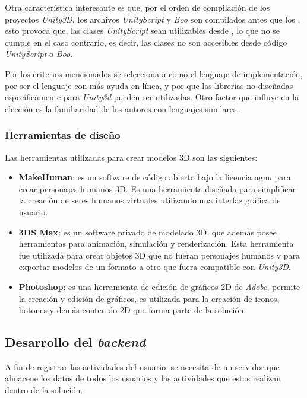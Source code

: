 Otra característica interesante es que, por el orden de compilación de los
proyectos \textit{Unity3D}, los archivos \textit{UnityScript} y \textit{Boo} son
compilados antes que los \cs{}, esto provoca que, las clases
\textit{UnityScript} sean utilizables desde \cs{}, lo que no se cumple en el
caso contrario, es decir, las clases \cs{} no son accesibles desde código
\textit{UnityScript} o \textit{Boo}.

Por los criterios mencionados se selecciona a \cs{} como el lenguaje de
implementación, por ser el lenguaje con más ayuda en línea, y por que las
librerías no diseñadas específicamente para \textit{Unity3d} pueden ser
utilizadas. Otro factor que influye en la elección es la familiaridad de los
autores con lenguajes similares. 

\subsubsection{Herramientas de diseño}

Las herramientas utilizadas para crear modelos 3D son las siguientes:

\begin{itemize}
\item \textbf{MakeHuman}: es un software de código abierto bajo la licencia
    \Gls{agnu} para crear personajes humanos 3D. Es una herramienta diseñada
    para simplificar la creación de seres humanos virtuales utilizando una
    interfaz gráfica de usuario\cite{makehuman}. 
\item \textbf{3DS Max}: es un software privado de modelado 3D, que además posee
    herramientas para animación, simulación y renderización. Esta herramienta
    fue utilizada para crear objetos 3D que no fueran personajes humanos y para
    exportar modelos de un formato a otro que fuera compatible con
    \textit{Unity3D}\cite{3dsmax}.
\item \textbf{Photoshop}: es una herramienta de edición de gráficos 2D de
    \textit{Adobe}, permite la creación y edición de gráficos, es utilizada para
    la creación de iconos, botones y demás contenido 2D que forma parte de la
    solución.
\end{itemize}

\subsection{Desarrollo del \textit{backend}}

A fin de registrar las actividades del usuario, se necesita de un servidor que
almacene los datos de todos los usuarios y las actividades que estos realizan
dentro de la solución.

